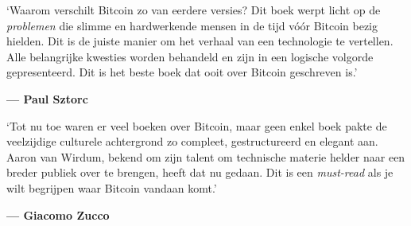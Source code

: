 \documentclass[
  a5paper,
  smalldemyvopaper,11pt,twoside,onecolumn,openright,extrafontsizes,
hidelinks]{memoir}
\renewenvironment{quote}%
               {\list{}{\rightmargin=.3cm\leftmargin=.3cm}%
                \itshape \item[]}%
               {\endlist}
\begin{document}
\begin{quote}
`Waarom verschilt Bitcoin zo van eerdere versies? Dit boek werpt licht
op de \emph{problemen} die slimme en hardwerkende mensen in de tijd vóór
Bitcoin bezig hielden. Dit is de juiste manier om het verhaal van een
technologie te vertellen. Alle belangrijke kwesties worden behandeld en
zijn in een logische volgorde gepresenteerd. Dit is het beste boek dat
ooit over Bitcoin geschreven is.'

\textbf{--- Paul Sztorc}
\end{quote}

\begin{quote}
`Tot nu toe waren er veel boeken over Bitcoin, maar geen enkel boek
pakte de veelzijdige culturele achtergrond zo compleet, gestructureerd
en elegant aan. Aaron van Wirdum, bekend om zijn talent om technische
materie helder naar een breder publiek over te brengen, heeft dat nu
gedaan. Dit is een \emph{must-read} als je wilt begrijpen waar Bitcoin
vandaan komt.'

\textbf{--- Giacomo Zucco}
\end{quote}
\end{document}
